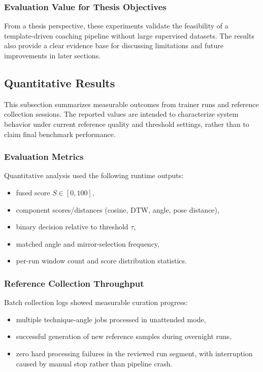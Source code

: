 \documentclass[12pt]{article}
\begin{document}
{\subsubsection{Evaluation Value for Thesis Objectives}

From a thesis perspective, these experiments validate the feasibility of a template-driven coaching pipeline without large supervised datasets. The results also provide a clear evidence base for discussing limitations and future improvements in later sections.

\subsection{Quantitative Results}

This subsection summarizes measurable outcomes from trainer runs and reference collection sessions. The reported values are intended to characterize system behavior under current reference quality and threshold settings, rather than to claim final benchmark performance.

\subsubsection{Evaluation Metrics}

Quantitative analysis used the following runtime outputs:

\begin{itemize}
    \item fused score \(S \in [0,100]\),
    \item component scores/distances (cosine, DTW, angle, pose distance),
    \item binary decision relative to threshold \(\tau\),
    \item matched angle and mirror-selection frequency,
    \item per-run window count and score distribution statistics.
\end{itemize}

\subsubsection{Reference Collection Throughput}

Batch collection logs showed measurable curation progress:

\begin{itemize}
    \item multiple technique-angle jobs processed in unattended mode,
    \item successful generation of new reference samples during overnight runs,
    \item zero hard processing failures in the reviewed run segment, with interruption caused by manual stop rather than pipeline crash.
\end{itemize}

}
\end{document}
